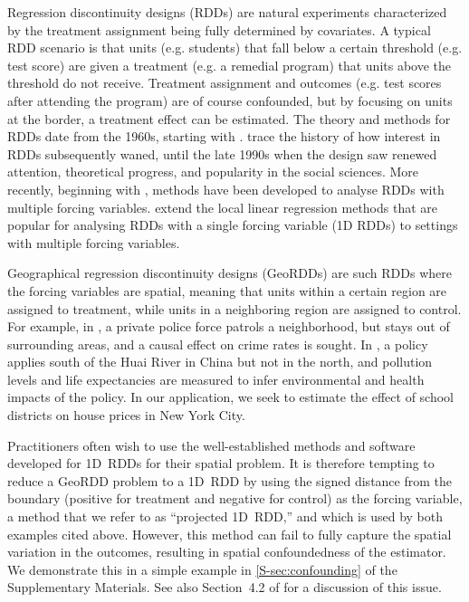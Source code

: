 \documentclass[12pt]{article}
\begin{document}
Regression discontinuity designs (RDDs) are natural experiments characterized by the treatment assignment being fully determined by covariates.
A typical RDD scenario is that units (e.g. students) that fall below a certain threshold (e.g. test score) are given a treatment (e.g. a remedial program) that units above the threshold do not receive.
Treatment assignment and outcomes (e.g. test scores after attending the program) are of course confounded, but by focusing on units at the border, a treatment effect can be estimated.
The theory and methods for RDDs date from the 1960s, starting with \cite{thistlethwaite1960regression}.
\cite{cook2008waiting} trace the history of how interest in RDDs subsequently waned, until the late 1990s when the design saw renewed attention, theoretical progress, and popularity in the social sciences.
More recently, beginning with \cite{papay2011extending}, methods have been developed to analyse RDDs with multiple forcing variables.
\cite{imbens2011regression} extend the local linear regression methods \citep[see][]{imbensrdd} that are popular for analysing RDDs with a single forcing variable (1D RDDs) to settings with multiple forcing variables.

Geographical regression discontinuity designs (GeoRDDs) are such RDDs where the forcing variables are spatial,
meaning that units within a certain region are assigned to treatment, while units in a neighboring region are assigned to control.
For example, in \cite{macdonald2015effect}, a private police force patrols a neighborhood, but stays out of surrounding areas, and a causal effect on crime rates is sought.
In \cite{chen2013evidence}, a policy applies south of the Huai River in China but not in the north, and pollution levels and life expectancies are measured to infer environmental and health impacts of the policy.
In our application, we seek to estimate the effect of school districts on house prices in New York City.

Practitioners often wish to use the well-established methods and software developed for 1D~RDDs for their spatial problem.
It is therefore tempting to reduce a GeoRDD problem to a 1D~RDD by using the signed distance from the boundary (positive for treatment and negative for control) as the forcing variable, a method that we refer to as ``projected 1D~RDD,'' and which is used by both examples cited above.
However, this method can fail to fully capture the spatial variation in the outcomes, resulting in spatial confoundedness of the estimator.
We demonstrate this in a simple example in \autoref*{S-sec:confounding} of the Supplementary Materials.
See also Section~4.2 of \cite{keele_titiunik_2015} for a discussion of this issue.
\end{document}
